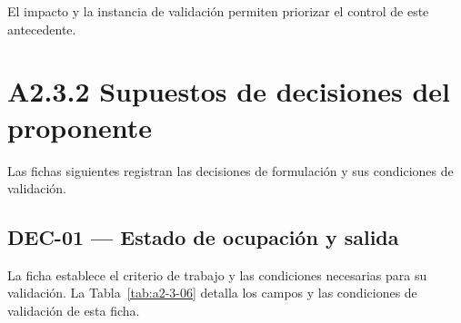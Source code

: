 El impacto y la instancia de validación permiten priorizar el control de este antecedente.


\section*{A2.3.2 Supuestos de decisiones del proponente}
Las fichas siguientes registran las decisiones de formulación y sus condiciones de validación.

\subsection*{DEC-01 — Estado de ocupación y salida}
La ficha establece el criterio de trabajo y las condiciones necesarias para su validación.
La Tabla~\ref{tab:a2-3-06} detalla los campos y las condiciones de validación de esta ficha.

